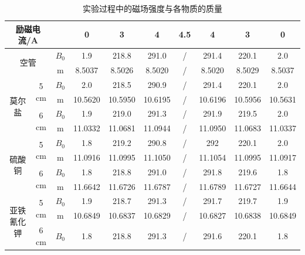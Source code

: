 \documentclass[cn,hazy,pku,12pt,normal,math=newtx,cite=super]{elegantnote}
\begin{document}
\begin{table}[h]
    \centering
    \caption{实验过程中的磁场强度与各物质的质量}
    \label{01}
    \begin{tabular}{cccccccccc}
    \hline
    \multicolumn{2}{c}{励磁电流/A}                     &       & 0       & 3       & 4       & 4.5 & 4       & 3       & 0       \\ \hline
    \multicolumn{2}{c}{\multirow{2}{*}{空管}}        & $B_0$ & 1.9     & 218.8   & 291.0     & /   & 291.4   & 220.1   & 2.0       \\
    \multicolumn{2}{c}{}                           & m     & 8.5037  & 8.5026  & 8.5020   & /   & 8.5020   & 8.5029  & 8.5037  \\\hline
    \multirow{4}{*}{莫尔盐} & \multirow{2}{*}{5 cm} & $B_0$ & 2.0       & 218.5   & 290.9   & /   & 291.4   & 220.1   & 2.0       \\
                           &                       & m     & 10.5620  & 10.5950  & 10.6195 & /   & 10.6196 & 10.5956 & 10.5631 \\
                           & \multirow{2}{*}{6 cm} & $B_0$ & 1.9     & 219.0     & 291.3   & /   & 291.9   & 219.5   & 2.0       \\
                           &                       & m     & 11.0332 & 11.0681 & 11.0944 & /   & 11.0950  & 11.0683 & 11.0337 \\\hline
    \multirow{4}{*}{硫酸铜} & \multirow{2}{*}{5 cm} & $B_0$ & 1.8     & 219.2   & 290.8   & /   & 292     & 220.1   & 2.0       \\
                           &                       & m     & 11.0916 & 11.0995 & 11.1050  & /   & 11.1054 & 11.0995 & 11.0917 \\
                           & \multirow{2}{*}{6 cm} & $B_0$ & 1.8     & 218.8   & 291.0     & /   & 291.8   & 219.6   & 1.8     \\
                           &                       & m     & 11.6642 & 11.6726 & 11.6787 & /   & 11.6789 & 11.6727 & 11.6644 \\\hline
    \multirow{4}{*}{亚铁氰化钾} & \multirow{2}{*}{5 cm} & $B_0$ & 1.9     & 218.7   & 291.3   & /   & 291.7   & 219.7   & 1.9     \\
                           &                       & m     & 10.6849 & 10.6837 & 10.6829 & /   & 10.6827 & 10.6838 & 10.6849 \\
                           & \multirow{2}{*}{6 cm} & $B_0$ & 1.8     & 218.8   & 291.3   & /   & 291.6   & 220.1   & 1.8     \\

\end{tabular}
\end{table}
\end{document}
